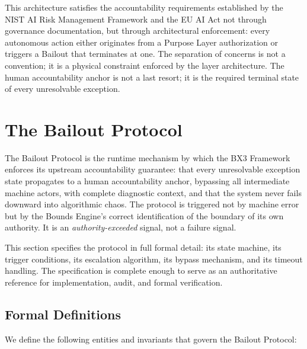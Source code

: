 \documentclass[12pt]{article}
\begin{document}
This architecture satisfies the accountability requirements established by the NIST AI Risk Management Framework and the EU AI Act not through governance documentation, but through architectural enforcement: every autonomous action either originates from a Purpose Layer authorization or triggers a Bailout that terminates at one. The separation of concerns is not a convention; it is a physical constraint enforced by the layer architecture. The human accountability anchor is not a last resort; it is the required terminal state of every unresolvable exception.


\section{The Bailout Protocol}
\label{sec:bailout-protocol}

The Bailout Protocol is the runtime mechanism by which the BX3 Framework enforces its upstream accountability guarantee: that every unresolvable exception state propagates to a human accountability anchor, bypassing all intermediate machine actors, with complete diagnostic context, and that the system never fails downward into algorithmic chaos. The protocol is triggered not by machine error but by the Bounds Engine's correct identification of the boundary of its own authority. It is an \textit{authority-exceeded} signal, not a failure signal.

This section specifies the protocol in full formal detail: its state machine, its trigger conditions, its escalation algorithm, its bypass mechanism, and its timeout handling. The specification is complete enough to serve as an authoritative reference for implementation, audit, and formal verification.

\subsection{Formal Definitions}
\label{sec:formal-definitions}

We define the following entities and invariants that govern the Bailout Protocol:

\bigskip
\end{document}
